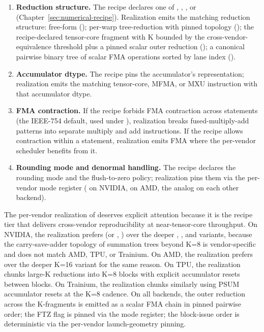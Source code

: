\begin{enumerate}
  \item \textbf{Reduction structure.}
        The recipe declares one of , , , or  (Chapter~\ref{sec:numerical-recipe}).
        Realization emits the matching reduction structure: free-form (); per-warp tree-reduction with pinned topology (); the recipe-declared tensor-core fragment with K bounded by the cross-vendor-equivalence threshold plus a pinned scalar outer reduction (); a canonical pairwise binary tree of scalar FMA operations sorted by lane index ().
  \item \textbf{Accumulator dtype.}
        The recipe pins the accumulator's representation; realization emits the matching tensor-core, MFMA, or MXU instruction with that accumulator dtype.
  \item \textbf{FMA contraction.}
        If the recipe forbids FMA contraction across statements (the IEEE-754 default, used under ), realization breaks fused-multiply-add patterns into separate multiply and add instructions.
        If the recipe allows contraction within a statement, realization emits FMA where the per-vendor scheduler benefits from it.
  \item \textbf{Rounding mode and denormal handling.}
        The recipe declares the rounding mode and the flush-to-zero policy; realization pins them via the per-vendor mode register ( on NVIDIA,  on AMD, the analog on each other backend).
\end{enumerate}

The per-vendor realization of  deserves explicit attention because it is the recipe tier that delivers cross-vendor reproducibility at near-tensor-core throughput.
On NVIDIA, the realization prefers  (or , ) over the deeper , , and  variants, because the carry-save-adder topology of summation trees beyond K=8 is vendor-specific and does not match AMD, TPU, or Trainium.
On AMD, the realization prefers  over the deeper K=16 variant for the same reason.
On TPU, the realization chunks large-K reductions into K=8 blocks with explicit accumulator resets between blocks.
On Trainium, the realization chunks similarly using PSUM accumulator resets at the K=8 cadence.
On all backends, the outer reduction across the K-fragments is emitted as a scalar FMA chain in pinned pairwise order; the FTZ flag is pinned via the mode register; the block-issue order is deterministic via the per-vendor launch-geometry pinning.

